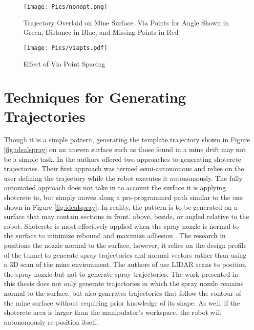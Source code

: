 \begin{figure}[h]
    \centering
    \texttt{[image: Pics/nonopt.png]}
    \caption{Trajectory Overlaid on Mine Surface. Via Points for Angle Shown in Green, Distance in Blue, and Missing Points in Red}
    \label{fig:unidealspray}
\end{figure}

\begin{figure}[h]
    \centering
    \texttt{[image: Pics/viapts.pdf]}
    \caption{Effect of Via Point Spacing}
    \label{fig:viapts}
\end{figure}

\section{Techniques for Generating Trajectories}
Though it is a simple pattern, generating the template trajectory shown in Figure \ref{fig:idealspray} on an uneven surface such as those found in a mine drift may not be a simple task. In \cite{fully} the authors offered two approaches to generating shotcrete trajectories. Their first approach was termed semi-autonomous and relies on the user defining the trajectory while the robot executes it autonomously. The fully automated approach does not take in to account the surface it is applying shotcrete to, but simply moves along a pre-programmed path similar to the one shown in Figure \ref{fig:idealspray}. In reality, the pattern is to be generated on a surface that may contain sections in front, above, beside, or angled relative to the robot. Shotcrete is most effectively applied when the spray nozzle is normal to the surface to minimize rebound and maximize adhesion \cite{spraypat}. The research in \cite{steal} positions the nozzle normal to the surface, however, it relies on the design profile of the tunnel to generate spray trajectories and normal vectors rather than using a 3D scan of the mine environment. The authors of \cite{artd} use LIDAR scans to position the spray nozzle but not to generate spray trajectories. The work presented in this thesis does not only generate trajectories in which the spray nozzle remains normal to the surface, but also generates trajectories that follow the contour of the mine surface without requiring prior knowledge of its shape. As well, if the shotcrete area is larger than the manipulator's workspace, the robot will autonomously re-position itself.\\

